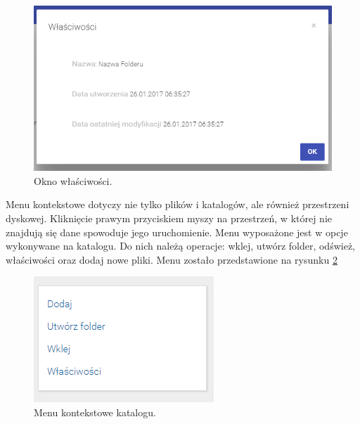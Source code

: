 \begin{figure}[!h]
	\centering
	\includegraphics[width=0.7\linewidth]{"obrazy/6.3 OknoWlasc"}
	\caption{Okno właściwości.}
	\label{descriptionWindow}
\end{figure}
\newpage
Menu kontekstowe dotyczy nie tylko plików i katalogów, ale również przestrzeni dyskowej. Kliknięcie prawym przyciskiem myszy na przestrzeń, w której nie znajdują się dane spowoduje jego uruchomienie. Menu wyposażone jest w opcje wykonywane na katalogu. Do nich należą operacje: wklej, utwórz folder, odśwież, właściwości oraz dodaj nowe pliki. Menu zostało przedstawione na rysunku \ref{DirectoryMenu}

\begin{figure}[!h]
	\centering
	\includegraphics[width=0.7\linewidth]{"obrazy/6.3 MenuKatalogu"}
	\caption{Menu kontekstowe katalogu.}
	\label{DirectoryMenu}
\end{figure}


